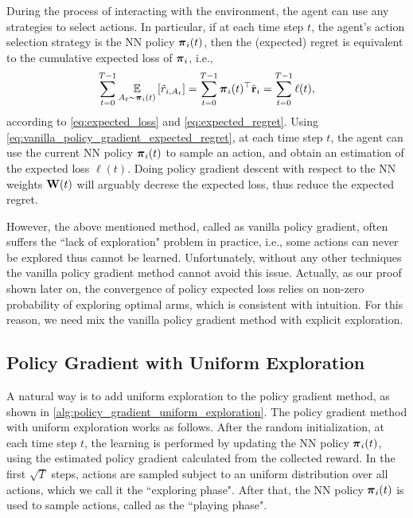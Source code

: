 During the process of interacting with the environment, the agent can use any strategies to select actions. In particular, if at each time step $t$, the agent's action selection strategy is the NN policy ${\boldsymbol{\pi}}_i(t)$, then the (expected) regret is equivalent to the cumulative expected loss of ${\boldsymbol{\pi}}_i$, i.e., 
\begin{equation}
\label{eq:vanilla_policy_gradient_expected_regret}
\begin{split}
    \sum\limits_{t=0}^{T-1}{ \operatorname*{{\mathbb{E}}}\limits_{A_t \sim {\boldsymbol{\pi}}_i(t)} \left[ \tilde{r}_{i, A_t} \right] } = \sum\limits_{t=0}^{T-1}{{\boldsymbol{\pi}}_i(t)^\top {\tilde{\mathbf{r}}}_i} = \sum\limits_{t=0}^{T-1}{\ell(t)},
\end{split}
\end{equation}
according to \cref{eq:expected_loss} and \cref{eq:expected_regret}. Using \cref{eq:vanilla_policy_gradient_expected_regret}, at each time step $t$, the agent can use the current NN policy ${\boldsymbol{\pi}}_i(t)$ to sample an action, and obtain an estimation of the expected loss $\ell(t)$. Doing policy gradient descent with respect to the NN weights ${\mathbf{W}}(t)$ will arguably decrese the expected loss, thus reduce the expected regret. 

However, the above mentioned method, called as vanilla policy gradient, often suffers the ``lack of exploration" problem in practice, i.e., some actions can never be explored thus cannot be learned. Unfortunately, without any other techniques the vanilla policy gradient method cannot avoid this issue. Actually, as our proof shown later on, the convergence of policy expected loss relies on non-zero probability of exploring optimal arms, which is consistent with intuition. For this reason, we need mix the vanilla policy gradient method with explicit exploration.

\subsection{Policy Gradient with Uniform Exploration}

A natural way is to add uniform exploration to the policy gradient method, as shown in \cref{alg:policy_gradient_uniform_exploration}. The policy gradient method with uniform exploration works as follows. After the random initialization, at each time step $t$, the learning is performed by updating the NN policy ${\boldsymbol{\pi}}_i(t)$, using the estimated policy gradient calculated from the collected reward. In the first $\sqrt{T}$ steps, actions are sampled subject to an uniform distribution over all actions, which we call it the ``exploring phase". After that, the NN policy ${\boldsymbol{\pi}}_i(t)$ is used to sample actions, called as the ``playing phase".


